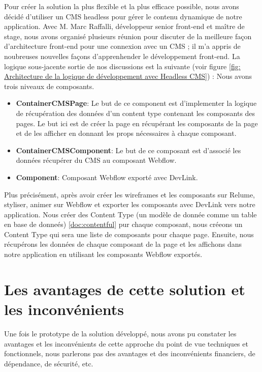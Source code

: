 Pour créer la solution la plus flexible et la plus efficace possible, nous avons décidé d'utiliser un CMS headless pour gérer le contenu dynamique de notre application. Avec M. Marc Raffalli, développeur senior front-end et maître de stage, nous avons organisé plusieurs réunion pour discuter de la meilleure façon d'architecture front-end pour une connexion avec un CMS ; il m'a appris de noubreuses nouvelles façons d'apprenhender le développement front-end. La logique sous-jacente sortie de nos discussions est la suivante (voir figure \ref{fig: Architecture de la logique de développement avec Headless CMS}) :
Nous avons trois niveaux de composants.
\begin{itemize}
  \item \textbf{ContainerCMSPage}: Le but de ce component est d'implementer la logique de récupération des données d'un content type contenant les composants des pages. Le but ici est de créer la page en récupérant les composants de la page et de les afficher en donnant les props nécessaires à chaque composant.
  \item \textbf{ContainerCMSComponent}: Le but de ce composant est d'associé les données récupérer du CMS au composant Webflow.
  \item \textbf{Component}: Composant Webflow exporté avec DevLink.
\end{itemize}
\vspace{0.8cm}
Plus précisément, après avoir créer les wireframes et les composants sur Relume, styliser, animer sur Webflow et exporter les composants avec DevLink vers notre application. Nous créer des Content Type (un modèle de donnée comme un table en base de donneés) \ref{doc:contentful} pur chaque composant, nous créeons un Content Type qui sera une liste de composants pour chaque page. Ensuite, nous récupérons les données de chaque composant de la page et les affichons dans notre application en utilisant les composants Webflow exportés.

\section{Les avantages de cette solution et les inconvénients}

Une fois le prototype de la solution développé, nous avons pu constater les avantages et les inconvénients de cette approche du point de vue techniques et fonctionnels, nous parlerons pas des avantages et des inconvénients financiers, de dépendance, de sécurité, etc.

